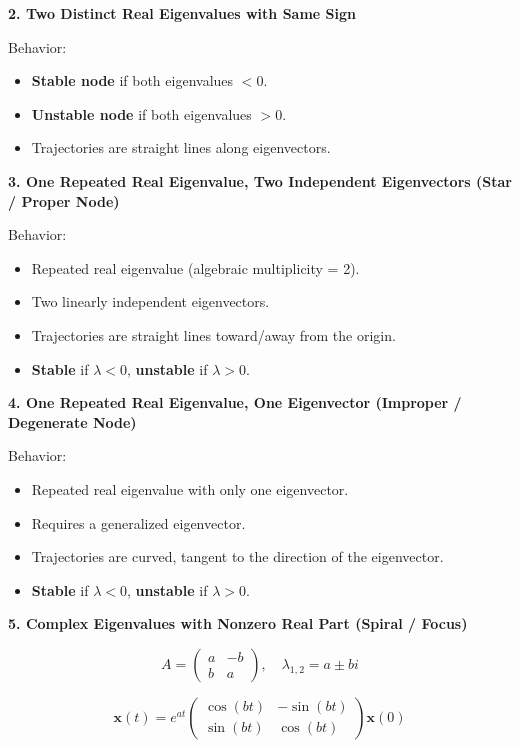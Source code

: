 \documentclass{report}
\begin{document}
\textbf{2. Two Distinct Real Eigenvalues with Same Sign}

Behavior:
\begin{itemize}
  \item \textbf{Stable node} if both eigenvalues $< 0$.
  \item \textbf{Unstable node} if both eigenvalues $> 0$.
  \item Trajectories are straight lines along eigenvectors.
\end{itemize}

\textbf{3. One Repeated Real Eigenvalue, Two Independent Eigenvectors (Star / Proper Node)}

Behavior:
\begin{itemize}
  \item Repeated real eigenvalue (algebraic multiplicity = 2).
  \item Two linearly independent eigenvectors.
  \item Trajectories are straight lines toward/away from the origin.
  \item \textbf{Stable} if $\lambda < 0$, \textbf{unstable} if $\lambda > 0$.
\end{itemize}

\textbf{4. One Repeated Real Eigenvalue, One Eigenvector (Improper / Degenerate Node)}

Behavior:
\begin{itemize}
  \item Repeated real eigenvalue with only one eigenvector.
  \item Requires a generalized eigenvector.
  \item Trajectories are curved, tangent to the direction of the eigenvector.
  \item \textbf{Stable} if $\lambda < 0$, \textbf{unstable} if $\lambda > 0$.
\end{itemize}

\textbf{5. Complex Eigenvalues with Nonzero Real Part (Spiral / Focus)}

\[
A =
\begin{pmatrix}
a & -b\\
b & a
\end{pmatrix}, \quad
\lambda_{1,2} = a \pm bi
\]

\[
\mathbf{x}(t) = e^{at}
\begin{pmatrix}
\cos(bt) & -\sin(bt)\\
\sin(bt) & \cos(bt)
\end{pmatrix}
\mathbf{x}(0)
\]
\end{document}
